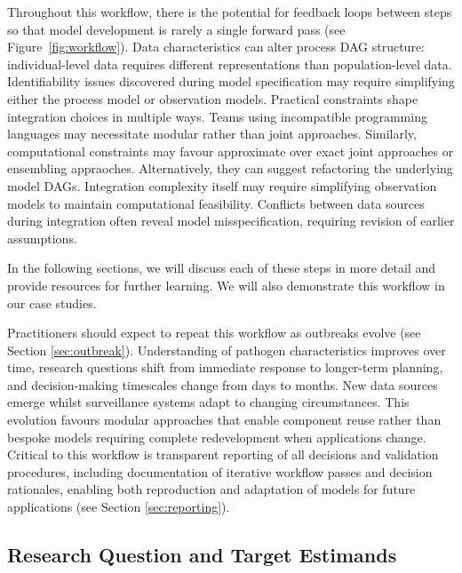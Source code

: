 \documentclass{article}
\begin{document}
Throughout this workflow, there is the potential for feedback loops between steps so that model development is rarely a single forward pass (see Figure~\ref{fig:workflow}). 
Data characteristics can alter process DAG structure: individual-level data requires different representations than population-level data. 
Identifiability issues discovered during model specification may require simplifying either the process model or observation models. 
Practical constraints shape integration choices in multiple ways. 
Teams using incompatible programming languages may necessitate modular rather than joint approaches. 
Similarly, computational constraints may favour approximate over exact joint approaches or ensembling appraoches.
Alternatively, they can suggest refactoring the underlying model DAGs.
Integration complexity itself may require simplifying observation models to maintain computational feasibility. 
Conflicts between data sources during integration often reveal model misspecification, requiring revision of earlier assumptions.

In the following sections, we will discuss each of these steps in more detail and provide resources for further learning. We will also demonstrate this workflow in our case studies.

Practitioners should expect to repeat this workflow as outbreaks evolve (see Section \ref{sec:outbreak}).
Understanding of pathogen characteristics improves over time, research questions shift from immediate response to longer-term planning, and decision-making timescales change from days to months.
New data sources emerge whilst surveillance systems adapt to changing circumstances.
This evolution favours modular approaches that enable component reuse rather than bespoke models requiring complete redevelopment when applications change.
Critical to this workflow is transparent reporting of all decisions and validation procedures, including documentation of iterative workflow passes and decision rationales, enabling both reproduction and adaptation of models for future applications  (see Section \ref{sec:reporting}).

\subsection{Research Question and Target Estimands}
\end{document}
